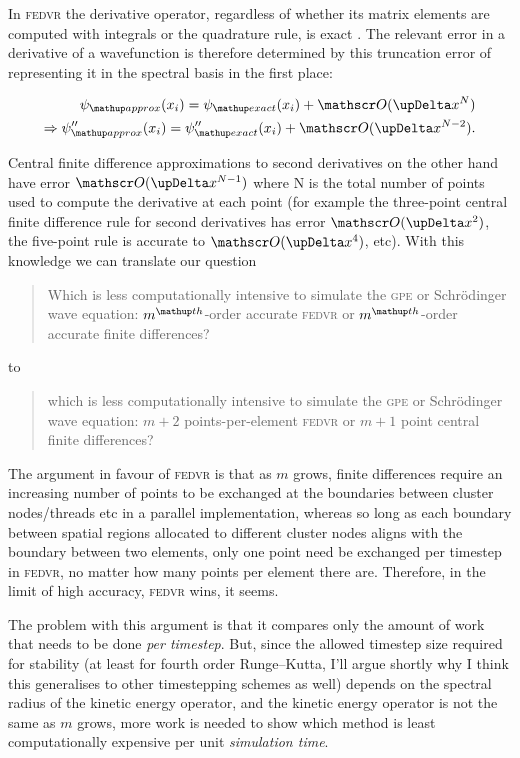 In \textsc{fedvr} the derivative operator, regardless of whether its matrix elements are computed with integrals or the quadrature rule, is exact \cite{schneider_discrete_2005}. The relevant error in a derivative of a wavefunction is therefore determined by this truncation error of representing it in the spectral basis in the first place:

\begin{align}
\psi_\up{approx}(x_i) = \psi_\up{exact}(x_i) + \Ord{\upDelta x^N}\\
\Rightarrow\psi^{\prime \prime}_\up{approx}(x_i) =  \psi^{\prime\prime}_\up{exact}(x_i) + \Ord{\upDelta x^{N-2}}.
\end{align} 

Central finite difference approximations to second derivatives on the other hand have error $\Ord{\upDelta x^{N - 1}}$ where N is the total number of points used to compute the derivative at each point (for example the three-point central finite difference rule for second derivatives has error $\Ord{\upDelta x^2}$, the five-point rule is accurate to $\Ord{\upDelta x^4}$, etc). With this knowledge we can translate our question

\begin{quote}
Which is less computationally intensive to simulate the \textsc{gpe} or Schr\"odinger wave equation: $m^\up{th}$-order accurate \textsc{fedvr} or $m^\up{th}$-order accurate finite differences?
\end{quote}
to
\begin{quote}
which is less computationally intensive to simulate the \textsc{gpe} or Schr\"odinger wave equation: $m+2$ points-per-element \textsc{fedvr} or $m+1$ point central finite differences?
\end{quote}
The argument in favour of \textsc{fedvr} is that as $m$ grows, finite differences require an increasing number of points to be exchanged at the boundaries between cluster nodes/threads etc in a parallel implementation, whereas so long as each boundary between spatial regions allocated to different cluster nodes aligns with the boundary between two elements, only one point need be exchanged per timestep in \textsc{fedvr}, no matter how many points per element there are. Therefore, in the limit of high accuracy, \textsc{fedvr} wins, it seems.

The problem with this argument is that it compares only the amount of work that needs to be done \emph{per timestep}. But, since the allowed timestep size required for stability (at least for fourth order Runge--Kutta, I'll argue shortly why I think this generalises to other timestepping schemes as well) depends on the spectral radius of the kinetic energy operator, and the kinetic energy operator is not the same as $m$ grows, more work is needed to show which method is least computationally expensive per unit \emph{simulation time}.

